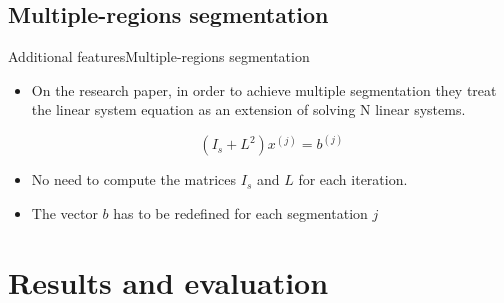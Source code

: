 \documentclass[10pt]{beamer}
\begin{document}
\subsection{Multiple-regions segmentation}
\begin{frame} {Additional features}{Multiple-regions segmentation}
\begin{itemize}
\item On the research paper, in order to achieve multiple segmentation they treat the linear system equation as an extension of solving N linear systems.

\begin{equation}
    (I_{s} + L^{2})x^{(j)} = b^{(j)}
    \end{equation}
    
  \vspace{0.4cm}
 \item No need to compute the matrices $I_s$ and $L$ for each iteration.
 \item The vector $b$ has to be redefined for each segmentation $j$
\end{itemize}
\end{frame}
\section{Results and evaluation}
\end{document}
